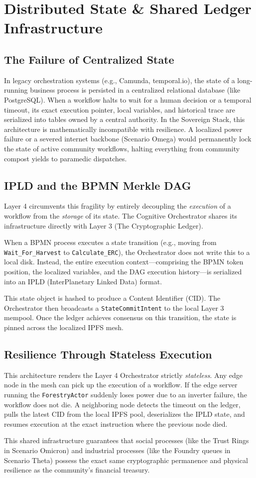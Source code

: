 \chapter{Distributed State \& Shared Ledger Infrastructure}

\section{The Failure of Centralized State}
In legacy orchestration systems (e.g., Camunda, temporal.io), the state of a long-running business process is persisted in a centralized relational database (like PostgreSQL). When a workflow halts to wait for a human decision or a temporal timeout, its exact execution pointer, local variables, and historical trace are serialized into tables owned by a central authority. In the Sovereign Stack, this architecture is mathematically incompatible with resilience. A localized power failure or a severed internet backbone (Scenario Omega) would permanently lock the state of active community workflows, halting everything from community compost yields to paramedic dispatches. 

\section{IPLD and the BPMN Merkle DAG}
Layer 4 circumvents this fragility by entirely decoupling the \textit{execution} of a workflow from the \textit{storage} of its state. The Cognitive Orchestrator shares its infrastructure directly with Layer 3 (The Cryptographic Ledger). 

When a BPMN process executes a state transition (e.g., moving from \texttt{Wait\_For\_Harvest} to \texttt{Calculate\_ERC}), the Orchestrator does not write this to a local disk. Instead, the entire execution context---comprising the BPMN token position, the localized variables, and the DAG execution history---is serialized into an IPLD (InterPlanetary Linked Data) format. 

This state object is hashed to produce a Content Identifier (CID). The Orchestrator then broadcasts a \texttt{StateCommitIntent} to the local Layer 3 mempool. Once the ledger achieves consensus on this transition, the state is pinned across the localized IPFS mesh.

\section{Resilience Through Stateless Execution}
This architecture renders the Layer 4 Orchestrator strictly \textit{stateless}. Any edge node in the mesh can pick up the execution of a workflow. If the edge server running the \texttt{ForestryActor} suddenly loses power due to an inverter failure, the workflow does not die. A neighboring node detects the timeout on the ledger, pulls the latest CID from the local IPFS pool, deserializes the IPLD state, and resumes execution at the exact instruction where the previous node died. 

This shared infrastructure guarantees that social processes (like the Trust Rings in Scenario Omicron) and industrial processes (like the Foundry queues in Scenario Theta) possess the exact same cryptographic permanence and physical resilience as the community's financial treasury.

